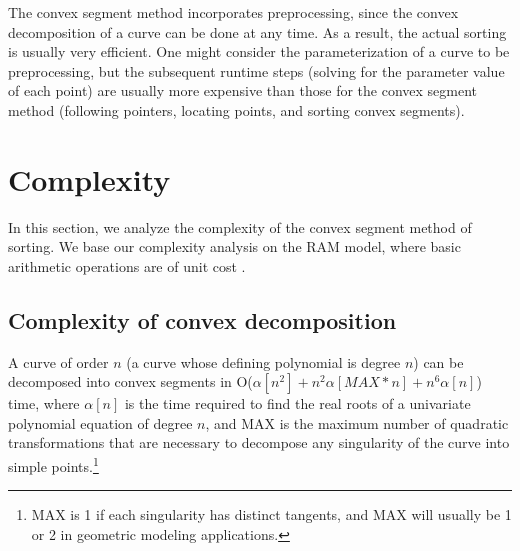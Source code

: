 The convex segment method incorporates preprocessing, since the convex decomposition
of a curve can be done at any time.
As a result, the actual sorting is usually very efficient.
One might consider the parameterization of a curve to be preprocessing, but
the subsequent runtime steps (solving for the parameter value of each point)
are usually more expensive than those for the convex segment method (following pointers,
locating points, and sorting convex segments).

\section{Complexity}
\label{s-c}

In this section, we analyze the complexity of the convex segment method of sorting.
We base our complexity analysis on the RAM model, where basic arithmetic operations
are of unit cost \cite{ahu}.

\subsection{Complexity of convex decomposition}

\begin{theorem}
A curve of order $n$ (a curve whose defining polynomial is degree $n$) 
can be decomposed into convex segments in
O($\alpha[n^{2}] + n^{2}\alpha[MAX * n] + n^{6}\alpha[n]$) time, 
where $\alpha[n]$ is the time required to find the 
real roots of a univariate polynomial equation of degree $n$, and MAX is the 
maximum number of quadratic transformations that are necessary to decompose any 
singularity of the curve into simple points.\footnote{MAX is 1 if each 
	singularity has distinct tangents, and MAX will usually be 1 or 2
	in geometric modeling applications. }
\end{theorem}
%

